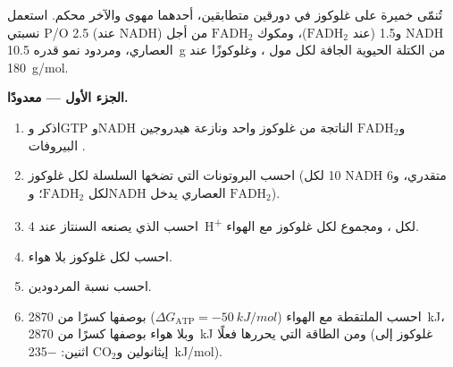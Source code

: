 \begin{problem}
\label{pb:b1:respiration-fermentation:1}
تُنمّى خميرة على غلوكوز في دورقين متطابقين، أحدهما مهوى والآخر محكم.
استعمل نسبتي P/O 2.5 (عند NADH) و1.5 (عند $\mathrm{FADH_2}$)،
ومكوك $\mathrm{FADH_2}$ من أجل NADH العصاري، ومردود نمو قدره \qty{10.5}{g} من
الكتلة الحيوية الجافة لكل مول ، وغلوكوزًا عند \qty{180}{g/mol}.

\medskip
\noindent\textbf{الجزء الأول ---  معدودًا.}
\begin{enumerate}
  \item اذكر  وGTP وNADH و$\mathrm{FADH_2}$ الناتجة من غلوكوز واحد
         ونازعة هيدروجين البيروفات .
  \item احسب البروتونات التي تضخها السلسلة لكل غلوكوز (10 لكل NADH
        متقدري، و6 لكل $\mathrm{FADH_2}$؛ وNADH العصاري يدخل
        $\mathrm{FADH_2}$).
  \item احسب  الذي يصنعه السنتاز عند \qty{4}{H^+} لكل ، ومجموع
         لكل غلوكوز مع الهواء.
  \item احسب  لكل غلوكوز بلا هواء.
  \item احسب نسبة المردودين.
  \item احسب  الملتقطة مع الهواء
        ($\Delta G_{\text{ATP}}
        = \qty{-50}{kJ/mol}$) بوصفها كسرًا من
        \qty{2870}{kJ}، وبلا هواء بوصفها كسرًا من \qty{2870}{kJ} ومن
        الطاقة التي يحررها  فعلًا (غلوكوز إلى إيثانولين
        و$\mathrm{CO_2}$ اثنين: \qty{-235}{kJ/mol}).
\end{enumerate}


\end{problem}

